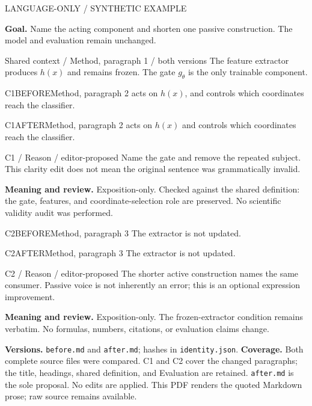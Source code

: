 \documentclass[11pt]{article}
\begin{document}
{\small\color{rcMuted}LANGUAGE-ONLY / SYNTHETIC EXAMPLE}

\textbf{Goal.} Name the acting component and shorten one passive construction.
The model and evaluation remain unchanged.

\begin{rcContext}{Shared context / Method, paragraph 1 / both versions}
The feature extractor produces $h(x)$ and remains frozen. The gate $g_\theta$ is the only trainable component.
\end{rcContext}

\begin{rcPassage}{C1}{BEFORE}{Method, paragraph 2}
 acts on $h(x)$, and  controls which coordinates reach the classifier.
\end{rcPassage}
\begin{rcPassage}{C1}{AFTER}{Method, paragraph 2}
 acts on $h(x)$ and controls which coordinates reach the classifier.
\end{rcPassage}
\ifrcannotations
\begin{rcContext}{C1 / Reason / editor-proposed}
Name the gate and remove the repeated subject. This clarity edit does not
mean the original sentence was grammatically invalid.
\end{rcContext}
\fi
{\small\textbf{Meaning and review.} Exposition-only. Checked against the shared
definition: the gate, features, and coordinate-selection role are preserved.
No scientific validity audit was performed.}

\begin{rcPassage}{C2}{BEFORE}{Method, paragraph 3}
 The extractor is not updated.
\end{rcPassage}
\begin{rcPassage}{C2}{AFTER}{Method, paragraph 3}
 The extractor is not updated.
\end{rcPassage}
\ifrcannotations
\begin{rcContext}{C2 / Reason / editor-proposed}
The shorter active construction names the same consumer. Passive voice is
not inherently an error; this is an optional expression improvement.
\end{rcContext}
\fi
{\small\textbf{Meaning and review.} Exposition-only. The frozen-extractor condition
remains verbatim. No formulas, numbers, citations, or evaluation claims change.}

{\footnotesize\color{rcMuted}\textbf{Versions.} \texttt{before.md} and
\texttt{after.md}; hashes in \texttt{identity.json}.
\textbf{Coverage.} Both complete source files were compared. C1 and C2 cover
the changed paragraphs; the title, headings, shared definition, and Evaluation
are retained. \texttt{after.md} is the sole proposal. No edits are applied.
This PDF renders the quoted Markdown prose; raw source remains available.}
\end{document}
